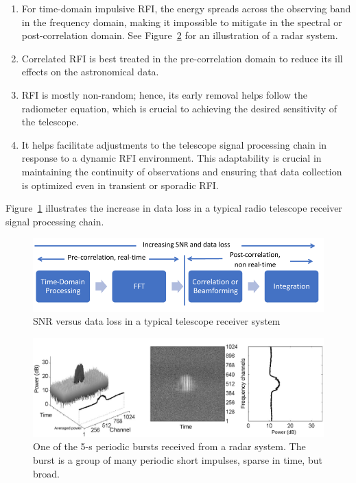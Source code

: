 \begin{enumerate}
\item For time-domain impulsive RFI, the energy spreads across the observing band in the frequency domain, making it impossible to mitigate in the spectral or post-correlation domain.  See Figure~\ref{fig:rfi_example_radar} for an illustration of a radar system.

\item Correlated RFI is best treated in the pre-correlation domain to reduce its ill effects on the astronomical data.

\item RFI is mostly non-random; hence, its early removal helps follow the radiometer equation, which is crucial to achieving the desired sensitivity of the telescope.

\item It helps facilitate adjustments to the telescope signal processing chain in response to a dynamic RFI environment. This adaptability is crucial in maintaining the continuity of observations and ensuring that data collection is optimized even in transient or sporadic RFI.
\end{enumerate}

Figure~\ref{fig:real-time-rfi} illustrates the increase in data loss in a typical radio telescope receiver signal processing chain.

\begin{figure}
    \centering
    \includegraphics[scale=0.8]{Hardware Excision Techniques/figures/rt.jpg}
    \caption{SNR versus data loss in a typical telescope receiver system}
    \label{fig:real-time-rfi}
\end{figure}


\begin{figure}
    \centering
    \includegraphics[height=.20\textheight]{figures/radar.pdf}
    \caption{One of the 5-s periodic bursts received from a radar system.  The burst is a group of many periodic short impulses, sparse in time, but broad.  }
    \label{fig:rfi_example_radar}
\end{figure}

